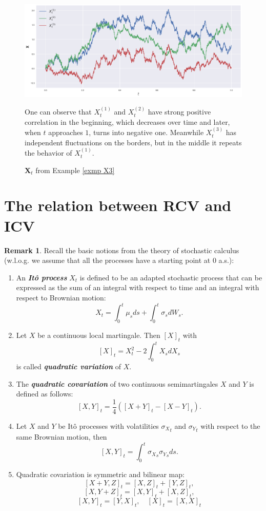 \documentclass[a4paper,11pt]{article}
\theoremstyle{plain}
\theoremstyle{definition}
\newtheorem{rmrk}[thm]{Remark}
\newcommand{\define}[1]{\textit{\textbf{#1}}}
\begin{document}
	\begin{figure}
		\begin{center} \centering
			\includegraphics[scale=0.4]{X3}
			\caption{$\mathbf{X}_t$ from Example \ref{exmp X3}}
			\smallskip
			\small
			One can observe that $X_t^{(1)}$ and $X_t^{(2)}$ have strong positive correlation in the beginning, which decreases over time and later, when $t$ approaches $1$, turns into negative one. Meanwhile $X_t^{(3)}$ has independent fluctuations on the borders, but in the middle it repeats the behavior of $X_t^{(1)}$.
		\end{center}
	\end{figure}
	
	\section*{The relation between RCV and ICV}
	
	\begin{rmrk} \label{stoch calc notions}
		Recall the basic notions from the theory of stochastic calculus (w.l.o.g. we assume that all the processes have a starting point at $0$ a.s.):
		\begin{enumerate}
			\item An \define{Itô process} $X_t$ is defined to be an adapted stochastic process that can be expressed as the sum of an integral with respect to time and an integral with respect to Brownian motion:
			\[ X_t = \int_{0}^{t} \mu_s ds + \int_{0}^{t} \sigma_s dW_s. \]
			\item Let $X$ be a continuous local martingale. Then $[X]_t$ with
			\[ [X]_t = X_t^2 - 2 \int_0^t X_sdX_s \]
			is called \define{quadratic variation} of $X$.
			\item The \define{quadratic covariation} of two continuous semimartingales $X$ and $Y$ is defined as follows:
			\[ [X, Y]_t = \frac{1}{4}([X + Y]_t - [X-Y]_t). \]
			\item Let $X$ and $Y$ be Itô processes with volatilities ${\sigma_X}_t$ and ${\sigma_Y}_t$ with respect to the same Brownian motion, then
			\[ [X, Y]_t = \int_0^t {\sigma_X}_s{\sigma_Y}_s ds. \]
			\item Quadratic covariation is symmetric and bilinear map:
			\[ [X + Y, Z]_t = [X, Z]_t + [Y, Z]_t, \]
			\[ [X, Y + Z]_t = [X, Y]_t + [X, Z]_t, \]
			\[ [X, Y]_t = [Y, X]_t, \quad [X]_t = [X, X]_t \]
		\end{enumerate}
	\end{rmrk}
	
\end{document}
